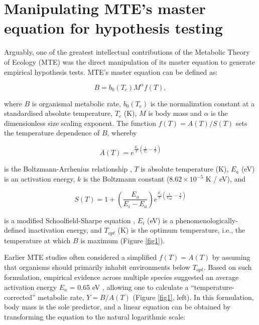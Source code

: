 \documentclass[a4paper,12pt]{article}
\begin{document}
\bigskip
\bigskip

\section{Manipulating MTE's master equation for hypothesis testing}
\label{exploring}

Arguably, one of the greatest intellectual contributions of the Metabolic Theory of Ecology (MTE) was the direct manipulation of its master equation to generate empirical hypothesis tests. MTE's master equation can be defined as:

\begin{equation}
  B = b_0(T_c) M^\alpha f(T),
  \label{eq1}
\end{equation}

where $B$ is organismal metabolic rate, $b_0(T_c)$ is the normalization constant at a standardised absolute temperature, $T_c$ (K), $M$ is body mass and $\alpha$ is the dimensionless size scaling exponent. The function $f(T) = A(T)/S(T)$ sets the temperature dependence of $B$, whereby 

\begin{equation}
    A(T) = e^{\frac{E_a}{k}\left(\frac{1}{T_c} - \frac{1}{T}\right)}
    \label{eqAB}
\end{equation} 

is the Boltzmann-Arrhenius relationship \citep{gillooly2001science}, $T$ is absolute temperature (K), $E_a$ (eV) is an activation energy, $k$ is the Boltzmann constant ($8.62 \times 10^{-5}$ K / eV), and

\begin{equation}
    S(T) = 1 + \left(\frac{E_a}{E_i - E_a}\right) e^{\frac{E_i}{k}\left(\frac{1}{T_{opt}} - \frac{1}{T}\right)}
    \label{eqSS}
\end{equation} 

is a modified Schoolfield-Sharpe equation \citep{schoolfield1981, barneche2014ele}, $E_i$ (eV) is a phenomenologically-defined inactivation energy, and $T_{opt}$ (K) is the optimum temperature, i.e., the temperature at which $B$ is maximum (Figure \ref{fig1}).

Earlier MTE studies often considered a simplified $f(T) = A(T)$ by assuming that organisms should primarily inhabit environments below $T_{opt}$. Based on such formulation, empirical evidence across multiple species suggested an average activation energy $E_a$ = 0.65 eV \citep{gillooly2001science, brown2004ecology}, allowing one to calculate a ``temperature-corrected'' metabolic rate, $Y = B / A(T)$ (Figure \ref{fig1}, left). In this formulation, body mass is the sole predictor, and a linear equation can be obtained by transforming the equation to the natural logarithmic scale:
\end{document}
